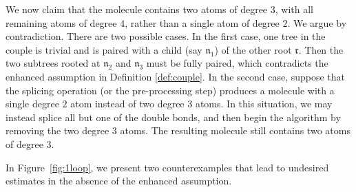 \documentclass[UTF-8,reqno]{amsart}
\numberwithin{equation}{section}
\theoremstyle{definition}
\begin{document}
We now claim that the molecule contains two atoms of degree $3$, 
with all remaining atoms of degree $4$, rather than a single atom of degree $2$. 
We argue by contradiction. There are two possible cases.
In the first case, one tree in the couple is trivial and is paired with a child 
(say $\mathfrak{n}_1$) of the other root $\mathfrak{r}$. 
Then the two subtrees rooted at $\mathfrak{n}_2$ and $\mathfrak{n}_3$ must be fully paired, 
which contradicts the enhanced assumption in Definition \ref{def:couple}. 
In the second case, suppose that the splicing operation (or the pre-processing step) 
produces a molecule with a single degree $2$ atom instead of two degree $3$ atoms. 
In this situation, we may instead splice all but one of the double bonds, 
and then begin the algorithm by removing the two degree $3$ atoms. 
The resulting molecule still contains two atoms of degree $3$.

In Figure~\ref{fig:1loop}, we present two counterexamples that lead to undesired estimates 
in the absence of the enhanced assumption.
 
\end{document}
